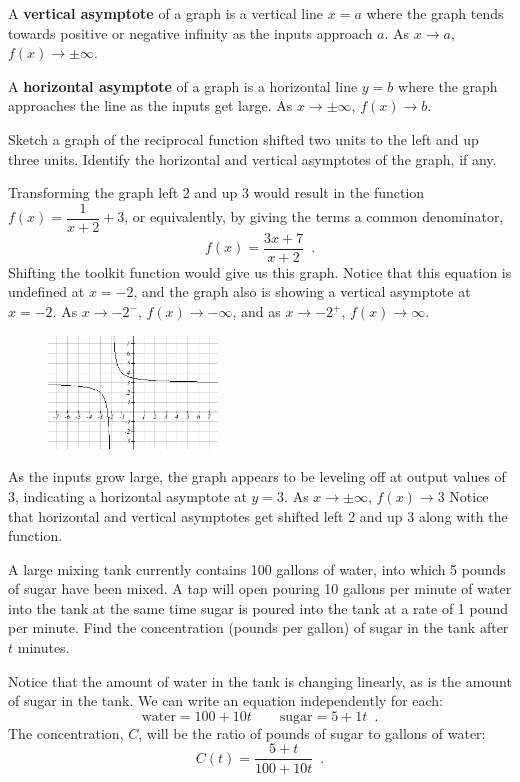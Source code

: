 \begin{definition}
A {\bf vertical asymptote} of a graph is a vertical line $x=a$ where the graph tends towards positive or negative infinity as the inputs approach $a$. As $x\to a$, $f(x)\to\pm\infty$.

A {\bf horizontal asymptote} of a graph is a horizontal line $y=b$ where the graph approaches the line as the inputs get large. As $x\to\pm\infty$, $f(x)\to b$.
\end{definition}
\begin{example}
Sketch a graph of the reciprocal function shifted two units to the left and up three units. Identify the horizontal and vertical asymptotes of the graph, if any.

\begin{solution} Transforming the graph left 2 and up 3 would result in the function $f(x)=\dfrac{1}{x+2}+3$, or equivalently, by giving the terms a common denominator,
$$f(x)=\dfrac{3x+7}{x+2} \enspace.$$
Shifting the toolkit function would give us this graph. Notice that this equation is undefined at $x=-2$, and the graph also is showing a vertical asymptote at $x=-2$. As $x\to-2^-$, $f(x)\to-\infty$, and as $x\to-2^+$, $f(x)\to\infty$.

\begin{figure}[!ht]
\centering
\includegraphics[width=0.4\textwidth]{img/chap1/sec1-5/image071.png}
\caption{}
\end{figure}
As the inputs grow large, the graph appears to be leveling off at output values of 3, indicating a horizontal asymptote at $y=3$. As $x\to\pm\infty$, $f(x)\to 3$
Notice that horizontal and vertical asymptotes get shifted left 2 and up 3 along with the function.
\end{solution}\end{example}

\begin{example}
A large mixing tank currently contains 100 gallons of water, into which 5 pounds of sugar have been mixed. A tap will open pouring 10 gallons per minute of water into the tank at the same time sugar is poured into the tank at a rate of 1 pound per minute. Find the concentration (pounds per gallon) of sugar in the tank after $t$ minutes.

\begin{solution} Notice that the amount of water in the tank is changing linearly, as is the amount of sugar in the tank. We can write an equation independently for each:
$$\text{water}=100+10t \qquad \text{sugar}=5+1t \enspace .$$
The concentration, $C$, will be the ratio of pounds of sugar to gallons of water:
$$C(t)=\dfrac{5+t}{100+10t} \enspace .$$
\end{solution}\end{example}

